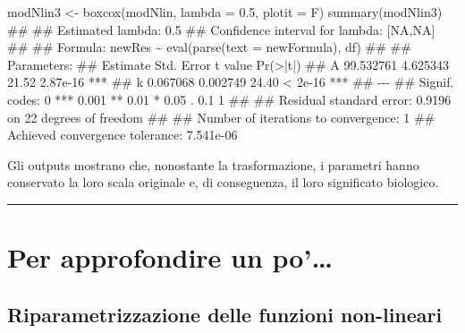 \documentclass[a4paper,12pt,oneside]{book}
\newenvironment{Shaded}{\begin{snugshade}}{\end{snugshade}}
\newcommand{\FloatTok}[1]{#1}
\newcommand{\DocumentationTok}[1]{#1}
\newcommand{\OtherTok}[1]{#1}
\newcommand{\FunctionTok}[1]{#1}
\newcommand{\AttributeTok}[1]{#1}
\newcommand{\NormalTok}[1]{#1}
\begin{document}
\begin{Shaded}
\begin{Highlighting}[]
\NormalTok{modNlin3 }\OtherTok{\textless{}{-}} \FunctionTok{boxcox}\NormalTok{(modNlin, }\AttributeTok{lambda =} \FloatTok{0.5}\NormalTok{, }\AttributeTok{plotit =}\NormalTok{ F)}
\FunctionTok{summary}\NormalTok{(modNlin3)}
\DocumentationTok{\#\# }
\DocumentationTok{\#\# Estimated lambda: 0.5 }
\DocumentationTok{\#\# Confidence interval for lambda: [NA,NA]}
\DocumentationTok{\#\# }
\DocumentationTok{\#\# Formula: newRes \textasciitilde{} eval(parse(text = newFormula), df)}
\DocumentationTok{\#\# }
\DocumentationTok{\#\# Parameters:}
\DocumentationTok{\#\#    Estimate Std. Error t value Pr(\textgreater{}|t|)    }
\DocumentationTok{\#\# A 99.532761   4.625343   21.52 2.87e{-}16 ***}
\DocumentationTok{\#\# k  0.067068   0.002749   24.40  \textless{} 2e{-}16 ***}
\DocumentationTok{\#\# {-}{-}{-}}
\DocumentationTok{\#\# Signif. codes:  0 \textquotesingle{}***\textquotesingle{} 0.001 \textquotesingle{}**\textquotesingle{} 0.01 \textquotesingle{}*\textquotesingle{} 0.05 \textquotesingle{}.\textquotesingle{} 0.1 \textquotesingle{} \textquotesingle{} 1}
\DocumentationTok{\#\# }
\DocumentationTok{\#\# Residual standard error: 0.9196 on 22 degrees of freedom}
\DocumentationTok{\#\# }
\DocumentationTok{\#\# Number of iterations to convergence: 1 }
\DocumentationTok{\#\# Achieved convergence tolerance: 7.541e{-}06}
\end{Highlighting}
\end{Shaded}

Gli outputs mostrano che, nonostante la trasformazione, i parametri hanno conservato la loro scala originale e, di conseguenza, il loro significato biologico.

\begin{center}\rule{0.5\linewidth}{0.5pt}\end{center}

\hypertarget{per-approfondire-un-po}{%
\section{Per approfondire un po'\ldots{}}\label{per-approfondire-un-po}}

\hypertarget{riparametrizzazione-delle-funzioni-non-lineari}{%
\subsection{Riparametrizzazione delle funzioni non-lineari}\label{riparametrizzazione-delle-funzioni-non-lineari}}
\end{document}
